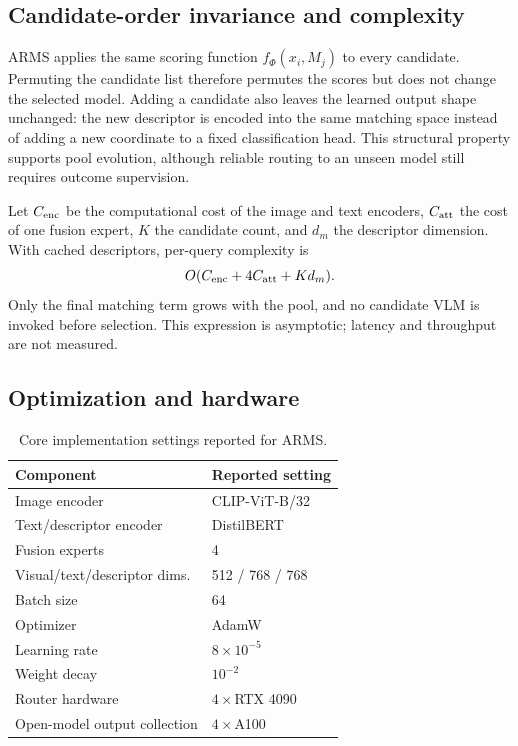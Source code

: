 \documentclass[letterpaper]{article}
\begin{document}
\subsection{Candidate-order invariance and complexity}

ARMS applies the same scoring function $f_{\Phi}(x_i,M_j)$ to every candidate.
Permuting the candidate list therefore permutes the scores but does not change
the selected model. Adding a candidate also leaves the learned output shape
unchanged: the new descriptor is encoded into the same matching space instead
of adding a new coordinate to a fixed classification head. This structural
property supports pool evolution, although reliable routing to an unseen model
still requires outcome supervision.

Let $C_{\rm enc}$ be the computational cost of the image and text encoders,
$C_{\rm att}$ the cost of one fusion expert, $K$ the candidate count, and $d_m$
the descriptor dimension. With cached descriptors, per-query complexity is
\begin{equation}
O(C_{\rm enc}+4C_{\rm att}+Kd_m).
\end{equation}
Only the final matching term grows with the pool, and no candidate VLM is invoked
before selection. This expression is asymptotic; latency and throughput are not
measured.

\subsection{Optimization and hardware}

\begin{table}[t]
\centering
\small
\begin{tabular}{ll}
\toprule
Component & Reported setting\\
\midrule
Image encoder & CLIP-ViT-B/32\\
Text/descriptor encoder & DistilBERT\\
Fusion experts & 4\\
Visual/text/descriptor dims. & 512 / 768 / 768\\
Batch size & 64\\
Optimizer & AdamW\\
Learning rate & $8\times10^{-5}$\\
Weight decay & $10^{-2}$\\
Router hardware & $4\times$RTX 4090\\
Open-model output collection & $4\times$A100\\
\bottomrule
\end{tabular}
\caption{Core implementation settings reported for ARMS.}
\label{tab:implementation}
\end{table}
\end{document}
